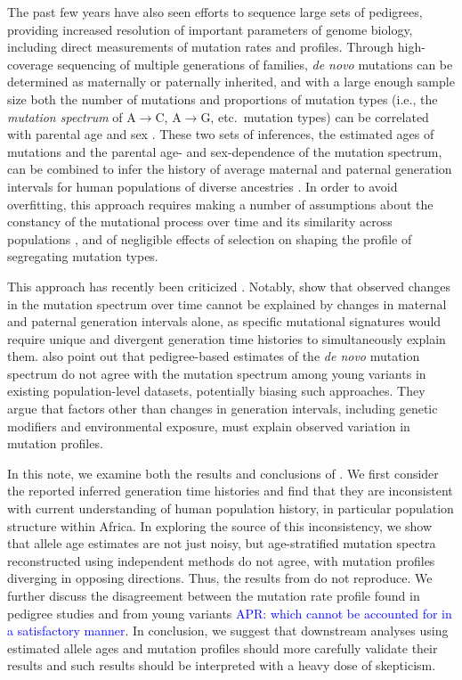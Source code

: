 \documentclass[]{article}
\newcommand{\aprcomment}[1]{{\textcolor{blue}{APR: #1}}}
\begin{document}
The past few years have also seen efforts to sequence large sets of pedigrees,
providing increased resolution of important parameters of genome biology,
including direct measurements of mutation rates and profiles. Through
high-coverage sequencing of multiple generations of families, \emph{de novo}
mutations can be determined as maternally or paternally inherited, and with a
large enough sample size both the number of mutations and proportions of
mutation types (i.e., the \emph{mutation spectrum} of A$\rightarrow$C,
A$\rightarrow$G, etc.\ mutation types) can be correlated with parental age and
sex \citep{jonsson2017parental,halldorsson2019characterizing}.  These two sets
of inferences, the estimated ages of mutations and the parental age- and
sex-dependence of the mutation spectrum, can be combined to infer the history
of average maternal and paternal generation intervals for human populations of
diverse ancestries \citep{macia2021different,wang2023human}. In order to avoid
overfitting, this approach requires making a number of assumptions about the
constancy of the mutational process over time and its similarity across
populations \citep{harris2015evidence,mathieson2017differences,harris2017rapid,
dewitt2021nonparametric}, and of negligible effects of selection on shaping the
profile of segregating mutation types.

This approach has recently been criticized \citep{gao2022limited}. Notably,
\citet{gao2022limited} show that observed changes in the mutation spectrum over
time cannot be explained by changes in maternal and paternal generation
intervals alone, as specific mutational signatures would require unique and
divergent generation time histories to simultaneously explain them.
\citet{gao2022limited} also point out that pedigree-based estimates of the
\emph{de novo} mutation spectrum do not agree with the mutation spectrum among
young variants in existing population-level datasets, potentially biasing such
approaches. They argue that factors other than changes in generation intervals,
including genetic modifiers and environmental exposure, must explain observed
variation in mutation profiles.

In this note, we examine both the results and conclusions of
\citet{wang2023human}. We first consider the reported inferred generation time
histories and find that they are inconsistent with current understanding of
human population history, in particular population structure within Africa. In
exploring the source of this inconsistency, we show that allele age estimates
are not just noisy, but age-stratified mutation spectra reconstructed using
independent methods do not agree, with mutation profiles diverging in opposing
directions. Thus, the results from \citet{wang2023human} do not reproduce. We
further discuss the disagreement between the mutation rate profile found in
pedigree studies and from young variants \aprcomment{which cannot be
accounted for in a satisfactory manner}. In conclusion, we suggest that
downstream analyses using estimated allele ages and mutation profiles should
more carefully validate their results and such results should be interpreted
with a heavy dose of skepticism.
\end{document}
